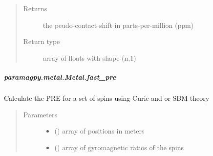 \documentclass[a4paper,10pt,english]{sphinxmanual}
\begin{document}
\begin{fulllineitems}
\begin{fulllineitems}
\begin{fulllineitems}
\begin{quote}
\begin{description}
\item[{Returns}] \leavevmode
{} \textendash{} the peudo-contact shift in parts-per-million (ppm)

\item[{Return type}] \leavevmode
array of floats with shape (n,1)

\end{description}\end{quote}

\end{fulllineitems}



\subparagraph{paramagpy.metal.Metal.fast\_pre}
\label{\detokenize{reference/generated/paramagpy.metal.Metal.fast_pre:paramagpy-metal-metal-fast-pre}}\label{\detokenize{reference/generated/paramagpy.metal.Metal.fast_pre::doc}}

\begin{fulllineitems}
\label{\detokenize{reference/generated/paramagpy.metal.Metal.fast_pre:paramagpy.metal.Metal.fast_pre}}
Calculate the PRE for a set of spins using Curie and or SBM theory
\begin{quote}\begin{description}
\item[{Parameters}] \leavevmode\begin{itemize}
\item {} 
 (\sphinxstyleliteralemphasis{\sphinxupquote{ (}}\sphinxstyleliteralemphasis{\sphinxupquote{,}}\sphinxstyleliteralemphasis{\sphinxupquote{)}}) \textendash{} array of positions in meters

\item {} 
 (\sphinxstyleliteralemphasis{\sphinxupquote{ (}}\sphinxstyleliteralemphasis{\sphinxupquote{,}}\sphinxstyleliteralemphasis{\sphinxupquote{)}}) \textendash{} array of gyromagnetic ratios of the spins


\end{itemize}
\end{description}
\end{quote}
\end{fulllineitems}
\end{fulllineitems}
\end{fulllineitems}
\end{document}
